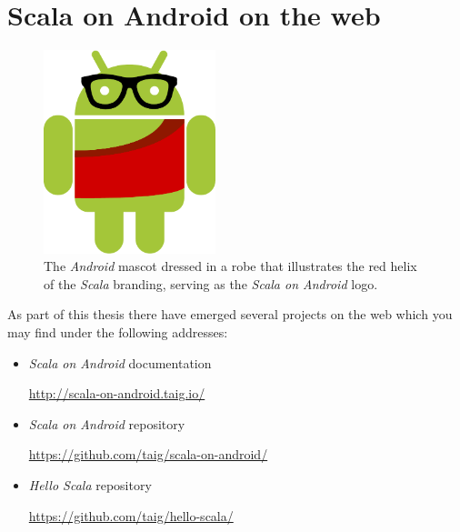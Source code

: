 \section{Scala on Android on the web}

\begin{figure}
	\centering
		\includegraphics[width=5cm]{asset/logo.pdf}
		\caption{The \textit{Android} mascot dressed in a robe that illustrates the red helix of the \textit{Scala} branding, serving as the \textit{Scala on Android} logo.}
\end{figure}

As part of this thesis there have emerged several projects on the web which you may find under the following addresses:

\begin{itemize}

	\item \textit{Scala on Android} documentation

	\url{http://scala-on-android.taig.io/}

	\item \textit{Scala on Android} repository

	\url{https://github.com/taig/scala-on-android/}

	\item \textit{Hello Scala} repository

	\url{https://github.com/taig/hello-scala/}

\end{itemize}